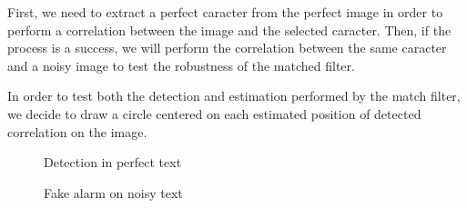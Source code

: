 First, we need to extract a perfect caracter from the perfect image in order to perform a correlation between the image and the selected caracter. Then, if the process is a success, we will perform the correlation between the same caracter and a noisy image to test the robustness of the matched filter.

In order to test both the detection and estimation performed by the match filter, we decide to draw a circle centered on each estimated position of detected correlation on the image.

\begin{figure}[h]
    \centering
	\caption{Detection in perfect text}
\end{figure}

\begin{figure}[h]
    \centering
	\caption{Fake alarm on noisy text}
\end{figure}
\pagebreak